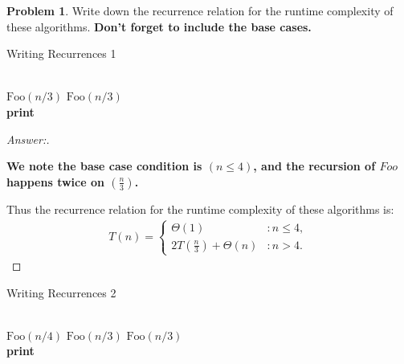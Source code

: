 \documentclass[11pt]{article}
\theoremstyle{definition}
\theoremstyle{definition}
\newtheorem{required}{Problem}
\theoremstyle{definition}
\begin{document}
\begin{required} \label{Recursive1}
Write down the recurrence relation for the runtime complexity of these algorithms. \textbf{Don't forget to include the base cases.}

\begin{algorithm}
\caption{Writing Recurrences 1}\label{alg:Recurrence1}
\begin{algorithmic}[1]
\Return
\EndIf

\noindent \\
\State $\text{Foo}(n/3)$
\State $\text{Foo}(n/3)$ \\

	\State \textbf{print} 
\EndFor
\EndProcedure
\end{algorithmic}
\end{algorithm}

\begin{proof}[Answer:] \
\item \textbf{We note the base case condition is $(n \leq 4)$, and the recursion of $Foo$ happens twice on $(\frac{n}{3})$.}
\item Thus the recurrence relation for the runtime complexity of these algorithms is: \\ 
\begin{align*}
T(n) = \begin{cases}
\Theta(1) & : n \leq 4, \\
2T(\frac{n}{3}) + \Theta(n) & : n > 4.
\end{cases}
\end{align*}
\end{proof}


\begin{comment}
\begin{align*}
T(n) &= \begin{cases}
5 & : \text{if } n \geq 0, \\
7 & : \text{if } n < 0.
\end{cases}
\end{align*}
\end{comment}




\newpage



\begin{algorithm}
\caption{Writing Recurrences 2}\label{alg:Recurrence2}
\begin{algorithmic}[1]
\Return
\EndIf

\noindent \\
\State $\text{Foo}(n/4)$
\State $\text{Foo}(n/3)$
\State $\text{Foo}(n/3)$ \\

	\State \textbf{print} 
\EndFor
\EndProcedure
\end{algorithmic}
\end{algorithm}
\end{required}
\end{document}
